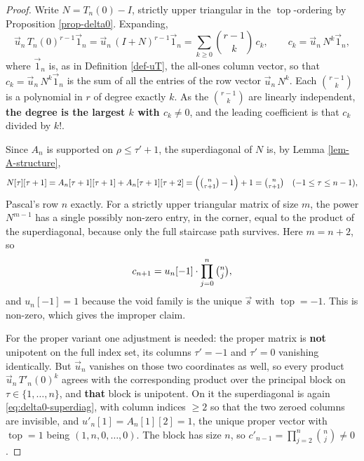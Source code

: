 \documentclass[11pt, a4paper, abstract=yes]{scrartcl}
\theoremstyle{definition}
\theoremstyle{remark}
\theoremstyle{plain}
\newcommand{\tp}{\operatorname{top}}
\begin{document}
\begin{proof}
Write \(N=T_n(0)-I\), strictly upper triangular in the \(\tp\)-ordering by Proposition
\ref{prop-delta0}. Expanding,
\begin{equation}\label{eq:delta0-expansion}
  \vec u_n\,T_n(0)^{r-1}\vec 1_n=\vec u_n\,(I+N)^{r-1}\vec 1_n
  =\sum_{k\ge0}\binom{r-1}{k}\,c_k,\qquad c_k=\vec u_n\,N^k\vec 1_n ,
\end{equation}
where \(\vec 1_n\) is, as in Definition \ref{def-uT}, the all-ones column vector, so that
\(c_k=\vec u_n\,N^k\vec 1_n\) is the sum of all the entries of the row vector \(\vec u_n\,N^k\). Each
\(\binom{r-1}{k}\) is a polynomial in \(r\) of degree exactly \(k\). As the \(\binom{r-1}{k}\)
are linearly independent, \textbf{the degree is the largest \(k\) with \(c_k\ne0\)}, and the leading
coefficient is that \(c_k\) divided by \(k!\).

Since \(A_n\) is supported on \(\rho\le\tau'+1\), the superdiagonal of \(N\) is, by
Lemma \ref{lem-A-structure},
\begin{equation}\label{eq:delta0-superdiag}
  N[\tau][\tau+1]=A_n[\tau+1][\tau+1]+A_n[\tau+1][\tau+2]
  =\Bigl(\tbinom n{\tau+1}-1\Bigr)+1=\tbinom n{\tau+1}
  \quad(-1\le\tau\le n-1),
\end{equation}
Pascal's row \(n\) exactly. For a strictly upper triangular matrix of size \(m\), the power
\(N^{m-1}\) has a single possibly non-zero entry, in the corner, equal to the product of the
superdiagonal, because only the full staircase path survives. Here \(m=n+2\), so
\begin{equation}\label{eq:delta0-corner}
  c_{n+1}=u_n[-1]\cdot\prod_{j=0}^{n}\tbinom nj ,
\end{equation}
and \(u_n[-1]=1\) because the void family is the unique
\(\vec s\) with \(\tp=-1\). This is non-zero, which gives the improper claim.

For the proper variant one adjustment is needed: the proper matrix is \textbf{not} unipotent on the full
index set, its columns \(\tau'=-1\) and \(\tau'=0\) vanishing identically. But \(\vec u_n\) vanishes on
those two coordinates as well, so every product \(\vec u_n\,T'_n(0)^k\) agrees with the corresponding
product over the principal block on \(\tau\in\lbrace1,\dots,n\rbrace\), and \textbf{that} block is
unipotent. On it the superdiagonal is again \eqref{eq:delta0-superdiag}, with column indices
\(\ge2\) so that the two zeroed columns are invisible, and \(u'_n[1]=A_n[1][2]=1\), the unique proper
vector with \(\tp=1\) being \((1,n,0,\dots,0)\). The block has size \(n\), so
\(c'_{n-1}=\prod_{j=2}^{n}\binom nj\ne0\).
\end{proof}
\end{document}
